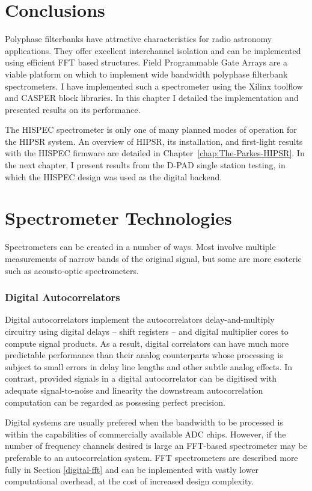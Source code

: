 \documentclass{ws-rv961x669}
\begin{document}
\section{Conclusions}

Polyphase filterbanks have attractive characteristics for radio astronomy
applications. They offer excellent interchannel isolation and can
be implemented using efficient FFT based structures. Field Programmable
Gate Arrays are a viable platform on which to implement wide bandwidth
polyphase filterbank spectrometers. I have implemented such a spectrometer
using the Xilinx toolflow and CASPER block libraries. In this chapter
I detailed the implementation and presented results on its performance.

The HISPEC spectrometer is only one of many planned modes of operation
for the HIPSR system. An overview of HIPSR, its installation, and
first-light results with the HISPEC firmware are detailed in Chapter~\ref{chap:The-Parkes-HIPSR}.
In the next chapter, I present results from the D-PAD single station
testing, in which the HISPEC design was used as the digital backend. 

\section{Spectrometer Technologies}\label{spectrometer-technologies}

Spectrometers can be created in a number of ways. Most involve multiple
measurements of narrow bands of the original signal, but some are more
esoteric such as acousto-optic spectrometers.




\subsubsection{Digital Autocorrelators}\label{digital-autocorrelators}
Digital autocorrelators implement the autocorrelators delay-and-multiply circuitry using digital delays -- shift registers -- and digital multiplier cores to compute signal products. As a result, digital correlators can have much more predictable performance than their analog counterparts whose processing is subject to small errors in delay line lengths and other subtle analog effects. In contrast, provided signals in a digital autocorrelator can be digitised with adequate signal-to-noise and linearity the downstream autocorrelation computation can be regarded as possesing perfect precision.

Digital systems are usually prefered when the bandwidth to be processed is within the capabilities of commercially available ADC chips. However, if the number of frequency channels desired is large an FFT-based spectrometer may be preferable to an autocorrelation system. FFT spectrometers are described more fully in Section \ref{digital-fft} and can be inplemented with vastly lower computational overhead, at the cost of increased design complexity.
\end{document}
